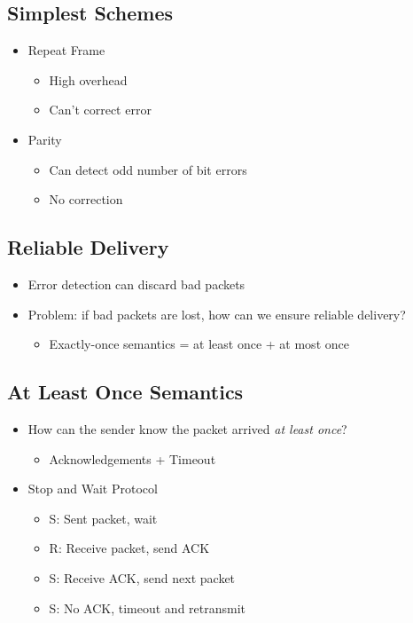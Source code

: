 \subsection{Simplest Schemes}
\begin{itemize}[nosep]
    \item Repeat Frame
          \begin{itemize}[nosep]
              \item High overhead
              \item Can't correct error
          \end{itemize}
    \item Parity
          \begin{itemize}[nosep]
              \item Can detect odd number of bit errors
              \item No correction
          \end{itemize}
\end{itemize}

\subsection{Reliable Delivery}
\begin{itemize}[nosep]
    \item Error detection can discard bad packets
    \item Problem: if bad packets are lost, how can we ensure reliable delivery?
          \begin{itemize}[nosep]
              \item Exactly-once semantics = at least once + at most once
          \end{itemize}
\end{itemize}
\subsection{At Least Once Semantics}
\begin{itemize}[nosep]
    \item How can the sender know the packet arrived \emph{at least once}?
          \begin{itemize}[nosep]
              \item Acknowledgements + Timeout
          \end{itemize}
    \item Stop and Wait Protocol
          \begin{itemize}[nosep]
              \item S: Sent packet, wait
              \item R: Receive packet, send ACK
              \item S: Receive ACK, send next packet
              \item S: No ACK, timeout and retransmit
          \end{itemize}
\end{itemize}

